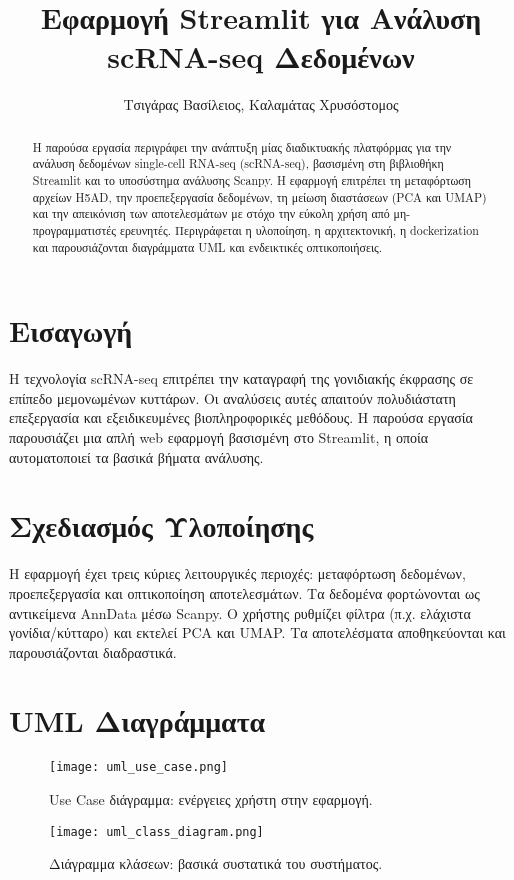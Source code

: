 \documentclass[a4paper,10pt]{article}
\title{Εφαρμογή Streamlit για Ανάλυση scRNA-seq Δεδομένων}
\author{Τσιγάρας Βασίλειος, Καλαμάτας Χρυσόστομος}
\date{}
\begin{document}
\maketitle

\begin{abstract}
Η παρούσα εργασία περιγράφει την ανάπτυξη μίας διαδικτυακής πλατφόρμας για την ανάλυση δεδομένων single-cell RNA-seq (scRNA-seq), βασισμένη στη βιβλιοθήκη Streamlit και το υποσύστημα ανάλυσης Scanpy. Η εφαρμογή επιτρέπει τη μεταφόρτωση αρχείων H5AD, την προεπεξεργασία δεδομένων, τη μείωση διαστάσεων (PCA και UMAP) και την απεικόνιση των αποτελεσμάτων με στόχο την εύκολη χρήση από μη-προγραμματιστές ερευνητές. Περιγράφεται η υλοποίηση, η αρχιτεκτονική, η dockerization και παρουσιάζονται διαγράμματα UML και ενδεικτικές οπτικοποιήσεις.
\end{abstract}

\section{Εισαγωγή}
Η τεχνολογία scRNA-seq επιτρέπει την καταγραφή της γονιδιακής έκφρασης σε επίπεδο μεμονωμένων κυττάρων. Οι αναλύσεις αυτές απαιτούν πολυδιάστατη επεξεργασία και εξειδικευμένες βιοπληροφορικές μεθόδους. Η παρούσα εργασία παρουσιάζει μια απλή web εφαρμογή βασισμένη στο Streamlit, η οποία αυτοματοποιεί τα βασικά βήματα ανάλυσης.

\section{Σχεδιασμός Υλοποίησης}
Η εφαρμογή έχει τρεις κύριες λειτουργικές περιοχές: μεταφόρτωση δεδομένων, προεπεξεργασία και οπτικοποίηση αποτελεσμάτων. Τα δεδομένα φορτώνονται ως αντικείμενα AnnData μέσω Scanpy. Ο χρήστης ρυθμίζει φίλτρα (π.χ. ελάχιστα γονίδια/κύτταρο) και εκτελεί PCA και UMAP. Τα αποτελέσματα αποθηκεύονται και παρουσιάζονται διαδραστικά.

\section{UML Διαγράμματα}

\begin{figure}[H]
\centering
\texttt{[image: uml\_use\_case.png]}
\caption{Use Case διάγραμμα: ενέργειες χρήστη στην εφαρμογή.}
\end{figure}

\begin{figure}[H]
\centering
\texttt{[image: uml\_class\_diagram.png]}
\caption{Διάγραμμα κλάσεων: βασικά συστατικά του συστήματος.}
\end{figure}
\end{document}
